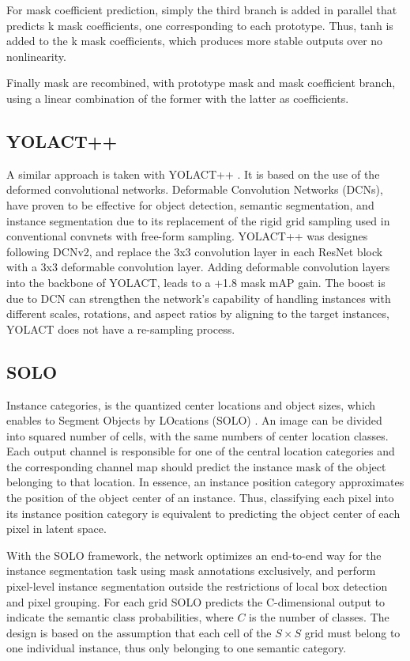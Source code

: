 For mask coefficient prediction, simply the third branch is added in parallel that predicts k mask coefficients, one corresponding to each prototype. Thus, tanh is added
to the k mask coefficients, which produces more stable outputs over no nonlinearity.

Finally mask are recombined, with prototype mask and mask coefficient branch, using a linear combination of the former with the latter as coefficients.

\subsection{YOLACT++}

A similar approach is taken with YOLACT++ \cite{2020}. It is based on the use of the deformed convolutional networks.
Deformable Convolution Networks (DCNs)\cite{dai2017deformable}, \cite{zhu2019deformable} have proven to be effective for object detection, semantic segmentation, and
instance segmentation due to its replacement of the rigid grid sampling used in conventional convnets with free-form sampling.
YOLACT++ was designes following DCNv2, and replace the 3x3 convolution layer in each ResNet block with a 3x3 deformable convolution layer.
Adding deformable convolution layers into the backbone of YOLACT, leads to a +1.8 mask mAP gain. The boost is due to DCN can strengthen the network’s capability of
handling instances with different scales, rotations, and aspect ratios by aligning to the target instances, YOLACT does not have a re-sampling process.
 
\subsection{SOLO}
Instance categories, is the quantized center locations and object sizes, which enables to Segment Objects by LOcations (SOLO) \cite{wang2020solov2}. An image can be
divided into squared number of cells, with the same numbers of center location classes. Each output channel is responsible for one of the central location categories
and the corresponding channel map should predict the instance mask of the object belonging to that location. In essence, an instance position category approximates
the position of the object center of an instance. Thus, classifying each pixel into its instance position category is equivalent to predicting the object center of
each pixel in latent space.

With the SOLO framework, the network optimizes an end-to-end way for the instance segmentation task using mask annotations exclusively, and perform pixel-level
instance segmentation outside the restrictions of local box detection and pixel grouping. For each grid SOLO predicts the C-dimensional output to indicate the
semantic class probabilities, where $C$ is the number of classes. The design is based on the assumption that each cell of the $S\times S$ grid must
belong to one individual instance, thus only belonging to one semantic category.

